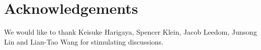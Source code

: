 \documentclass[preprintnumbers,amsmath,amssymb,prd,superscriptaddress]{revtex4}
\begin{document}
\section*{Acknowledgements}
We would like to thank Keisuke Harigaya, Spencer Klein, Jacob Leedom, Junsong Lin and Lian-Tao Wang for stimulating discussions.

\begin{thebibliography}{99}


\end{thebibliography}
\end{document}

